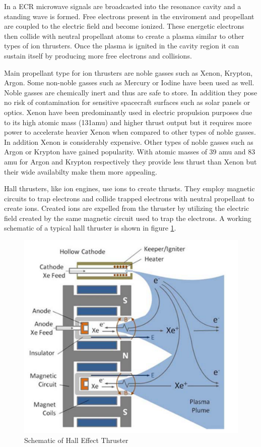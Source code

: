 In a ECR microwave signals are broadcasted into the resonance cavity and a standing wave is formed. Free electrons present in the enviroment and propellant are coupled to the electric field and become ionized. These energetic electrons then collide with neutral propellant atoms to create a plasma similar to other types of ion thrusters. Once the plasma is ignited in the cavity region it can sustain itself by producing more free electrons and collisions. 

Main propellant type for ion thrusters are noble gasses such as Xenon, Krypton, Argon. Some non-noble gasses such as Mercury or Iodine have been used as well. Noble gasses are chemically inert and thus are safe to store. In addition they pose no risk of contamination for sensitive spacecraft surfaces such as solar panels or optics. Xenon have been predominantly used in electric propulsion purposes due to its high atomic mass (131amu) and higher thrust output but it requires more power to accelerate heavier Xenon when compared to other types of noble gasses. In addition Xenon is considerably expensive. Other types of noble gasses such as Argon or Krypton have gained popularity. With atomic masses of 39 amu and 83 amu for Argon and Krypton respectively they provide less thrust than Xenon but their wide availabilty make them more appealing\cite{Calik2011}. 




Hall thrusters, like ion engines, use ions to create thrusts. They employ magnetic circuits to trap electrons and collide trapped electrons with neutral propellant to create ions. Created ions are expelled from the thruster by utilizing the electric field created by the same magnetic circuit used to trap the electrons. A working schematic of a typical hall thruster is shown in figure \ref{fig:HET}.

\begin{figure}[ht]
    \centering
    \includegraphics[scale=0.75]{fig/HET.png}
    \caption[Schematic of Hall Effect Thruster]{Schematic of Hall Effect Thruster\cite{szabo2020one}}
    \label{fig:HET}
\end{figure}


